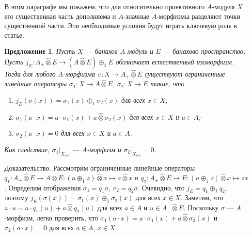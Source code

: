 \documentclass[12pt]{article}
\numberwithin{equation}{subsection}
\theoremstyle{plain}
\newtheorem{proposition}{Предложение}
\newenvironment{proof}{Доказательство.}{}
\newcommand{\projtens}{\mathbin{\widehat{\otimes}}}
\begin{document}
\begin{fulltext}
    В этом параграфе мы покажем, что для относительно проективного $A$-модуля
    $X$ его существенная часть дополняема и $A$-значные $A$-морфизмы разделяют
    точки существенной части. Эти необходимые условия будут играть ключевую роль
    в статье.

    \begin{proposition}\label{MorphDecomp} Пусть $X$ --- банахов $A$-модуль и
        $E$ --- банахово пространство. Пусть $j_E:A_+\projtens E\to (A\projtens
            E)\oplus_1 E$ обозначает естественный изоморфизм. Тогда для любого
        $A$-морфизма $\sigma:X\to A_+\projtens E$ существуют ограниченные
        линейные операторы $\sigma_1:X\to A\projtens E$, $\sigma_2:X\to E$
        такие, что
        \begin{enumerate}[label = (\roman*)]
            \item $j_E(\sigma(x))=\sigma_1(x)\oplus_1 \sigma_2(x)$ для всех
                  $x\in X$;

            \item $\sigma_1(a\cdot x)=a\cdot \sigma_1(x)+a\projtens \sigma_2(x)$
                  для всех $x\in X$ и $a\in A$;

            \item $\sigma_2(a\cdot x)=0$ для всех $x\in X$ и $a\in A$.
        \end{enumerate}

        \noindent
        Как следствие, $\sigma_1|_{X_{ess}}$ --- $A$-морфизм и
        $\sigma_2|_{X_{ess}}=0$.

    \end{proposition}
    \begin{proof} Рассмотрим ограниченные линейные операторы $q_1:A_+\projtens
            E\to A\projtens E: (a\oplus_1 z)\projtens x\mapsto a\projtens x$ и
        $q_2:A_+\projtens E\to E: (a\oplus_1 z)\projtens x\mapsto z x$.
        Определим отображения $\sigma_1=q_1\sigma$, $\sigma_2=q_2\sigma$.
        Очевидно, что $j_E=q_1\oplus_1 q_2$, поэтому
        $j_E(\sigma(x))=\sigma_1(x)\oplus_1 \sigma_2(x)$ для всех $x\in X$.
        Заметим, что $a\cdot u=a\cdot q_1(u)+a\projtens q_2(u)$ для всех
        $a\in A$ и $u\in A_+\projtens E$. Поскольку $\sigma$ ---
        $A$-морфизм, легко проверить, что $\sigma_1(a\cdot x)=a\cdot
            \sigma_1(x)+a\projtens \sigma_2(x)$ и $\sigma_2(a\cdot x)=0$ для
        всех $a\in A$, $x\in X$.
    \end{proof}


\end{fulltext}
\end{document}
